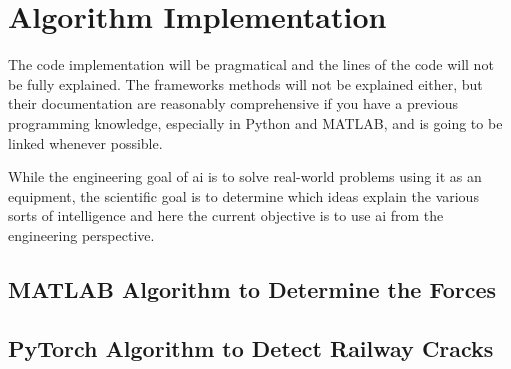 \section{Algorithm Implementation}

The code implementation will be pragmatical and the lines of the code will not be fully explained. The frameworks methods will not be explained either, but their documentation are reasonably comprehensive if you have a previous programming knowledge, especially in Python and MATLAB, and is going to be linked whenever possible.

While the engineering goal of \gls*{ai} is to solve real-world problems using it as an equipment, the scientific goal is to determine which ideas explain the various sorts of intelligence \citep{winston1992} and here the current objective is to use \gls*{ai} from the engineering perspective.

\subsection{MATLAB Algorithm to Determine the Forces}

\subsection{PyTorch Algorithm to Detect Railway Cracks}